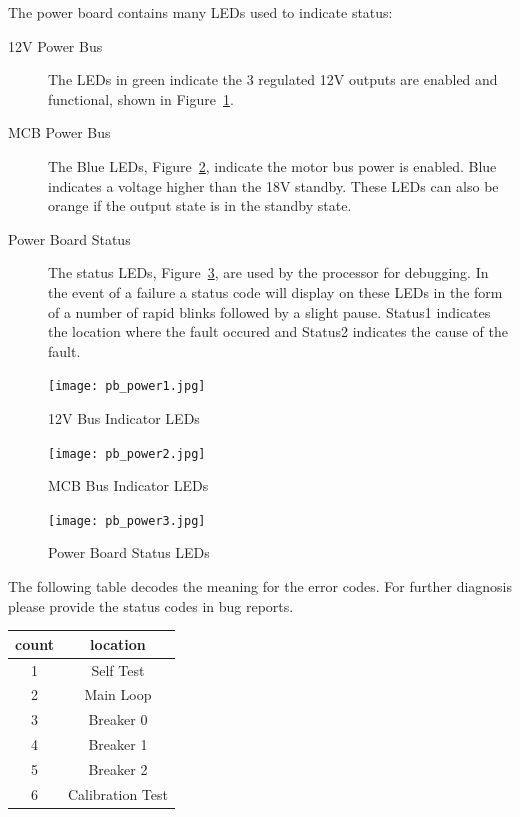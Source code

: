 The power board contains many LEDs used to indicate status:
\begin{description}
\item[12V Power Bus] The LEDs in green indicate the 3 regulated 12V
  outputs are enabled and functional, shown in Figure~\ref{fig:12Vbus}.
\item[MCB Power Bus]The Blue LEDs, Figure~\ref{fig:MCBbus}, indicate
  the motor bus power is enabled. Blue indicates a voltage higher than
  the 18V standby. These LEDs can also be orange if the output state
  is in the standby state.

\item[Power Board Status]The status LEDs,
  Figure~\ref{fig:powerboardstatus}, are used by the processor for
  debugging. In the event of a failure a status code will display on
  these LEDs in the form of a number of rapid blinks followed
  by a slight pause.  Status1 indicates the location where the fault
  occured and Status2 indicates the cause of the fault.
\end{description}


\begin{figure}[htb]
\centering
\texttt{[image: pb\_power1.jpg]}
\caption{12V Bus Indicator LEDs}
\label{fig:12Vbus}
\end{figure}

\begin{figure}[htb]
\centering
\texttt{[image: pb\_power2.jpg]}
\caption{MCB Bus Indicator LEDs}
\label{fig:MCBbus}
\end{figure}

\begin{figure}[htb]
\centering
\texttt{[image: pb\_power3.jpg]}
\caption{Power Board Status LEDs}
\label{fig:powerboardstatus}
\end{figure}


The following table decodes the meaning for the error codes. For further
diagnosis please provide the status codes in bug reports.

\begin{tabular}{|c|c|}
\hline
count & location \\
\hline
\hline
1 & Self Test \\
\hline
2 & Main Loop \\
\hline
3 & Breaker 0 \\
\hline
4 & Breaker 1 \\
\hline
5 & Breaker 2 \\
\hline
6 & Calibration Test \\
\hline
\end{tabular}

